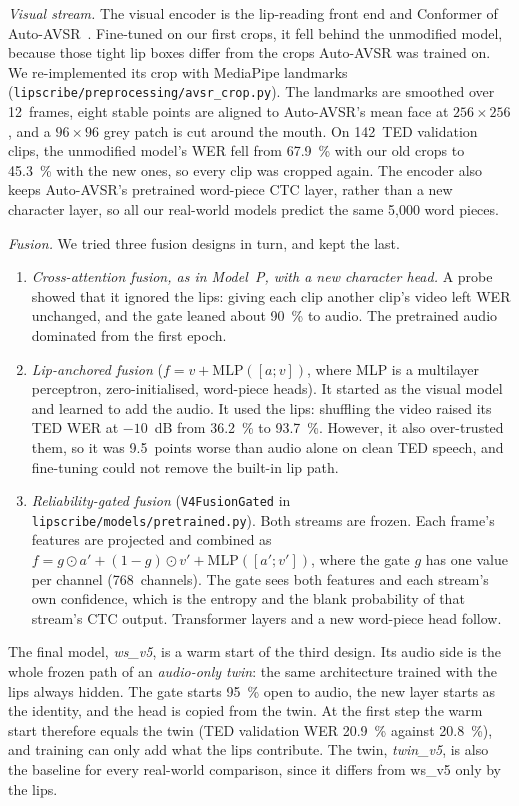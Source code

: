 \textit{Visual stream.} The visual encoder is the lip-reading front end and Conformer of
Auto-AVSR~\cite{ma2023}. Fine-tuned on our first crops, it fell behind the unmodified model,
because those tight lip boxes differ from the crops Auto-AVSR was trained on. We re-implemented
its crop with MediaPipe landmarks (\texttt{lipscribe/\allowbreak{}preprocessing/\allowbreak{}avsr\_\allowbreak{}crop.py}). The landmarks
are smoothed over 12~frames, eight stable points are aligned to Auto-AVSR's mean face at
$256 \times 256$, and a $96 \times 96$ grey patch is cut around the mouth. On 142~TED validation
clips, the unmodified model's WER fell from 67.9~\% with our old crops to 45.3~\% with the new
ones, so every clip was cropped again. The encoder also keeps Auto-AVSR's pretrained word-piece
CTC layer, rather than a new character layer, so all our real-world models predict the same
5,000 word pieces.

\textit{Fusion.} We tried three fusion designs in turn, and kept the last.
\begin{enumerate}
\item \textit{Cross-attention fusion, as in Model~P, with a new character head.} A probe showed
that it ignored the lips: giving each clip another clip's video left WER unchanged, and the gate
leaned about 90~\% to audio. The pretrained audio dominated from the first epoch.
\item \textit{Lip-anchored fusion} ($f = v + \mathrm{MLP}([a; v])$, where MLP is a multilayer perceptron, zero-initialised, word-piece
heads). It started as the visual model and learned to add the audio. It used the lips: shuffling
the video raised its TED WER at $-10$~dB from 36.2~\% to 93.7~\%. However, it also over-trusted
them, so it was 9.5~points worse than audio alone on clean TED speech, and fine-tuning could not
remove the built-in lip path.
\item \textit{Reliability-gated fusion} (\texttt{V4FusionGated} in
\texttt{lipscribe/\allowbreak{}models/\allowbreak{}pretrained.py}). Both streams are frozen. Each frame's features are
projected and combined as $f = g \odot a' + (1 - g) \odot v' + \mathrm{MLP}([a'; v'])$, where the
gate $g$ has one value per channel (768~channels). The gate sees both features and each stream's
own confidence, which is the entropy and the blank probability of that stream's CTC output.
Transformer layers and a new word-piece head follow.
\end{enumerate}
The final model, \textit{ws\_v5}, is a warm start of the third design. Its audio side is the whole
frozen path of an \textit{audio-only twin}: the same architecture trained with the lips always
hidden. The gate starts 95~\% open to audio, the new layer starts as the identity, and the head is
copied from the twin. At the first step the warm start therefore equals the twin (TED validation
WER 20.9~\% against 20.8~\%), and training can only add what the lips contribute. The twin,
\textit{twin\_v5}, is also the baseline for every real-world comparison, since it differs from
ws\_v5 only by the lips.

